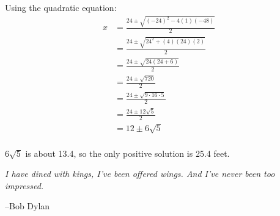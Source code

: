 \documentclass[fleqn,addpoints]{exam}
\begin{document}
\begin{questions}
\begin{parts}
\begin{solution}
Using the quadratic equation:
\begin{align*}
  x &= \frac{24 \pm \sqrt{(-24)^2 - 4(1)(-48)}}{2} \\
    &= \frac{24 \pm \sqrt{24^2 + (4)(24)(2)}}{2} \\
    &= \frac{24 \pm \sqrt{24(24 + 6)}}{2} \\
    &= \frac{24 \pm \sqrt{720}}{2} \\
    &= \frac{24 \pm \sqrt{9 \cdot 16 \cdot 5}}{2} \\
    &= \frac{24 \pm 12 \sqrt{5}}{2} \\
    &= 12 \pm 6\sqrt{5} \\    
\end{align*}

$6\sqrt{5}$ is about 13.4, so the only positive solution is 25.4 feet.

\end{solution}

\end{parts}

\end{questions}

\ifprintanswers
\else
\vspace{4 in}


{\em I have dined with kings, I've been offered wings. And I've never been too impressed.}

\vspace{.1 cm}
\hspace{1 cm} --Bob Dylan

\fi
\end{document}
